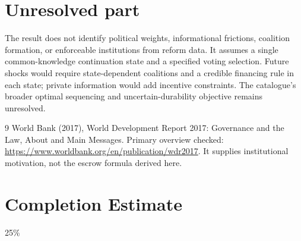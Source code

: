 \documentclass[11pt]{article}
\theoremstyle{definition}
\begin{document}
\section*{Unresolved part}
The result does not identify political weights, informational frictions, coalition formation, or enforceable institutions from reform data. It assumes a single common-knowledge continuation state and a specified voting selection. Future shocks would require state-dependent coalitions and a credible financing rule in each state; private information would add incentive constraints. The catalogue's broader optimal sequencing and uncertain-durability objective remains unresolved.
\begin{thebibliography}{9}
 World Bank (2017), World Development Report 2017: Governance and the Law, About and Main Messages. Primary overview checked: \url{https://www.worldbank.org/en/publication/wdr2017}. It supplies institutional motivation, not the escrow formula derived here.
\end{thebibliography}

\section{Completion Estimate}
25\%
\end{document}
